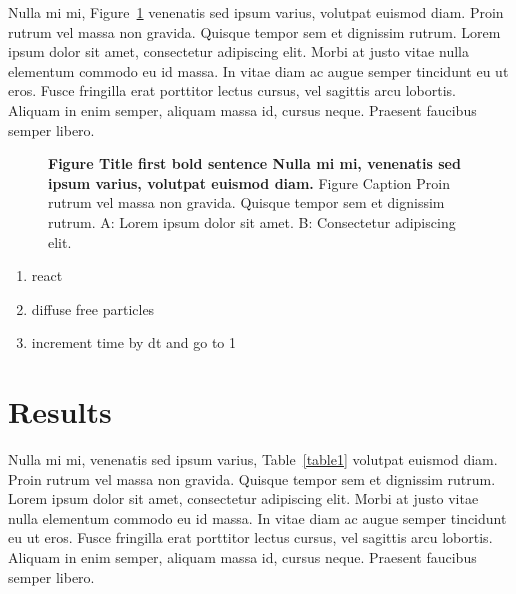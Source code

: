 Nulla mi mi, Figure~\ref{fig1} venenatis sed ipsum varius, volutpat euismod diam. Proin rutrum vel massa non gravida. Quisque tempor sem et dignissim rutrum. Lorem ipsum dolor sit amet, consectetur adipiscing elit. Morbi at justo vitae nulla elementum commodo eu id massa. In vitae diam ac augue semper tincidunt eu ut eros. Fusce fringilla erat porttitor lectus cursus,  vel sagittis arcu lobortis. Aliquam in enim semper, aliquam massa id, cursus neque. Praesent faucibus semper libero.

\begin{figure}[h]
\caption{{\bf Figure Title first bold sentence Nulla mi mi, venenatis sed ipsum varius, volutpat euismod diam.}
Figure Caption Proin rutrum vel massa non gravida. Quisque tempor sem et dignissim rutrum. A: Lorem ipsum dolor sit amet. B: Consectetur adipiscing elit.}
\label{fig1}
\end{figure}

\begin{enumerate}
\item{react}
\item{diffuse free particles}
\item{increment time by dt and go to 1}
\end{enumerate}

\section*{Results}
Nulla mi mi, venenatis sed ipsum varius, Table~\ref{table1} volutpat euismod diam. Proin rutrum vel massa non gravida. Quisque tempor sem et dignissim rutrum. Lorem ipsum dolor sit amet, consectetur adipiscing elit. Morbi at justo vitae nulla elementum commodo eu id massa. In vitae diam ac augue semper tincidunt eu ut eros. Fusce fringilla erat porttitor lectus cursus, vel sagittis arcu lobortis. Aliquam in enim semper, aliquam massa id, cursus neque. Praesent faucibus semper libero.


